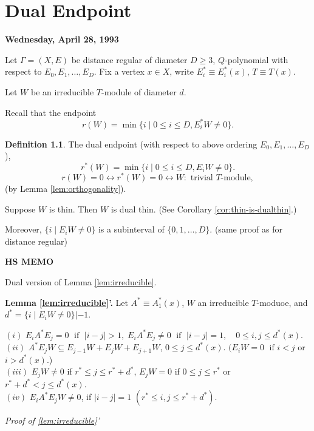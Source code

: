 \documentclass[
]{book}
\theoremstyle{definition}
\newtheorem{definition}{Definition}[chapter]
\theoremstyle{definition}
\theoremstyle{definition}
\theoremstyle{definition}
\theoremstyle{remark}
\begin{document}
\hypertarget{lec36}{%
\chapter{Dual Endpoint}\label{lec36}}

\textbf{Wednesday, April 28, 1993}

Let \(\Gamma = (X, E)\) be distance regular of diameter \(D\geq 3\), \(Q\)-polynomial with respect to \(E_0, E_1, \ldots, E_D\). Fix a vertex \(x\in X\), write \(E^*_i\equiv E^*_i(x)\), \(T\equiv T(x)\).

Let \(W\) be an irreducible \(T\)-module of diameter \(d\).

Recall that the endpoint
\[r(W) = \min\{i\mid 0\leq i\leq D, E^*_iW \neq 0\}.\]

\begin{definition}
\protect\hypertarget{def:dual-endpoint}{}\label{def:dual-endpoint}The dual endpoint  (with respect to above ordering \(E_0, E_1, \ldots, E_D\)),
\[r^*(W) = \min\{i\mid 0\leq i\leq D, E_iW \neq 0\}.\]
\[r(W) = 0 \leftrightarrow r^*(W) = 0 \leftrightarrow W: \text{ trivial $T$-module},\]
(by Lemma \ref{lem:orthogonality}).
\end{definition}

Suppose \(W\) is thin. Then \(W\) is dual thin.
(See Corollary \ref{cor:thin-is-dualthin}.)

Moreover, \(\{i\mid E_iW \neq 0\}\) is a subinterval of \(\{0, 1, \ldots, D\}\). (same proof as for distance regular)

\textbf{HS MEMO}

Dual version of Lemma \ref{lem:irreducible}.

\textbf{Lemma \ref{lem:irreducible}'.}
Let \(A^* \equiv A^*_1(x)\), \(W\) an irreducible \(T\)-moduoe, and \(d^* = \{i\mid E_iW\neq 0\}|-1\).

\((i)\) \(E_iA^*E_j = 0 \; \text{ if }\; |i-j|>1, \; E_iA^*E_j\neq 0 \; \text{ if }\; |i-j| = 1, \quad 0\leq i,j\leq d^*(x)\).\\
\((ii)\) \(A^*E_jW \subseteq E_{j-1}W + E_jW + E_{j+1}W\), \(0\leq j \leq d^*(x)\). \((E_iW = 0 \; \text{ if } i<j\) or \(i > d^*(x)\).)\\
\((iii)\) \(E_jW \neq 0\) if \(r^*\leq j \leq r^*+d^*\), \(E_jW=0\) if \(0\leq j\leq r^*\) or \(r^*+d^* < j \leq d^*(x)\).\\
\((iv)\) \(E_iA^*E_jW \neq 0\), if \(|i-j| = 1\) \((r^* \leq i,j \leq r^*+d^*)\).

\emph{Proof of \ref{lem:irreducible}'}
\end{document}
